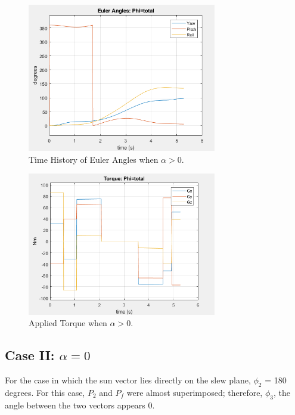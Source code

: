 \documentclass[letterpaper, preprint, paper,11pt]{AAS}	%
\begin{document}
			\begin{figure}[H]
				\label{fig:euler_ang_phi_total}
				\begin{center}
				\includegraphics[width=3.25in]{figures/alphaNot0/euler_ang_phi_total.png}
				\end{center}
				\caption{Time History of  Euler Angles when $\alpha>0$.}
			\end{figure}
		
			\begin{figure}[H]
				\label{fig:torque_total}
				\begin{center}
				\includegraphics[width=3.25in]{figures/alphaNot0/torque_total.png}
				\end{center}
				\caption{Applied Torque when $\alpha>0$.}
			\end{figure}
			
			
			
			\subsection{Case II: $\alpha = 0$} 
			
For the case in which the sun vector lies directly on the slew plane, $\phi_2$ = 180 degrees. For this case, $P_2$ and $P_f$ were almost superimposed; therefore, $\phi_3$, the angle between the two vectors appears 0. 
			
\end{document}
